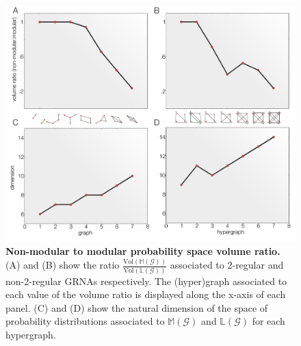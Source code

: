 
\begin{figure}[!ht]
\centering
\noindent\includegraphics[width=0.9\columnwidth]{fig/figure_graphs_dims_nolines.pdf}
\caption{{\bf Non-modular to modular probability space volume ratio.} (A) and (B) show the ratio $\frac{\text{Vol}(\mathbb{M}(\mathcal{G}))}{\text{Vol}(\mathbb{L}(\mathcal{G}))}$ associated to 2-regular and non-2-regular GRNAs respectively. The (hyper)graph associated to each value of the volume ratio is displayed along the x-axis of each panel. (C) and (D) show the natural dimension of the space of probability distributions associated to $\mathbb{M}(\mathcal{G})$ and $\mathbb{L}(\mathcal{G})$ for each hypergraph.}
\label{fig:ncycvolrat}
\end{figure}

